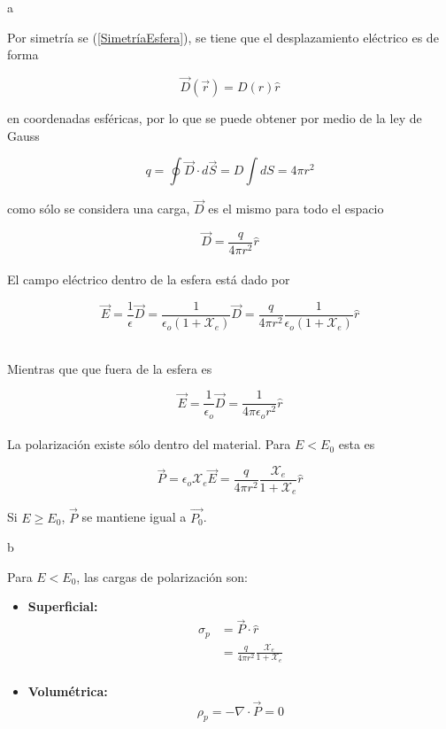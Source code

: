 \begin{solucion}{8} %

\ics a

Por simetría se (\ref{SimetríaEsfera}), se tiene que el desplazamiento eléctrico es de forma

\[\Vec{D}(\Vec{r}) = D(r)\hat{r}\]

en coordenadas esféricas, por lo que se puede obtener por medio de la ley de Gauss

\[q = \oint\Vec{D}\cdot d\Vec{S} = D\int dS = 4\pi r^2\]

como sólo se considera una carga, $\Vec{D}$ es el mismo para todo el espacio

\[\Vec{D}=\frac{q}{4\pi r^2}\hat{r}\]\\

El campo eléctrico dentro de la esfera está dado por

\[\Vec{E}=\frac{1}{\epsilon}\Vec{D}=
\frac{1}{\epsilon_o(1+\mathcal{X}_e)}\Vec{D}=
\frac{q}{4\pi r^2}\frac{1}{\epsilon_o(1+\mathcal{X}_e)}\hat{r}\]\\


 
\end{solucion}

Mientras que que fuera de la esfera es

\[\Vec{E}=\frac{1}{\epsilon_o}\Vec{D}=\frac{1}{4\pi\epsilon_o r^2}\hat{r}\]\\

La polarización existe sólo dentro del material. Para $E<E_0$ esta es

\[\Vec{P} = \epsilon_o\mathcal{X}_e\Vec{E} = \frac{q}{4\pi r^2}
\frac{\mathcal{X}_e}{1+\mathcal{X}_e}\hat{r}\]

Si $E\geq E_0$, $\Vec{P}$ se mantiene igual a $\Vec{P_0}$.

\ics b

Para $E<E_0$, las cargas de polarización son:

\begin{itemize}
    \item \textbf{Superficial:}
    \begin{equation}
    \begin{split}
        \sigma_p &= \Vec{P}\cdot\hat{r}\\
        &= \frac{q}{4\pi r^2}
        \frac{\mathcal{X}_e}{1+\mathcal{X}_e}\\
    \end{split}
    \nonumber
    \end{equation}
    \item \textbf{Volumétrica:}
    \[\rho_p = -\nabla\cdot\Vec{P} = 0\]
\end{itemize}

